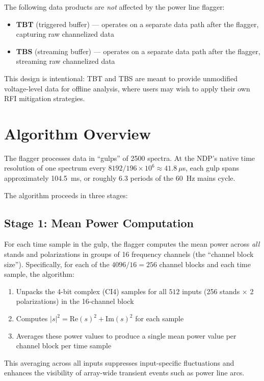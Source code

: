 The following data products are \emph{not} affected by the power line flagger:

\begin{itemize}
    \item \textbf{TBT} (triggered buffer) --- operates on a separate data path after the flagger, capturing raw channelized data
    \item \textbf{TBS} (streaming buffer) --- operates on a separate data path after the flagger, streaming raw channelized data
\end{itemize}

This design is intentional: TBT and TBS are meant to provide unmodified voltage-level data for offline analysis, where users may wish to apply their own RFI mitigation strategies.

\section{Algorithm Overview}

The flagger processes data in ``gulps'' of 2500 spectra. At the NDP's native time resolution of one spectrum every $8192 / 196 \times 10^6 \approx 41.8~\mu$s, each gulp spans approximately 104.5~ms, or roughly 6.3 periods of the 60~Hz mains cycle.

The algorithm proceeds in three stages:

\subsection{Stage 1: Mean Power Computation}

For each time sample in the gulp, the flagger computes the mean power across \emph{all} stands and polarizations in groups of 16 frequency channels (the ``channel block size''). Specifically, for each of the $4096/16 = 256$ channel blocks and each time sample, the algorithm:

\begin{enumerate}
    \item Unpacks the 4-bit complex (CI4) samples for all $512$ inputs (256 stands $\times$ 2 polarizations) in the 16-channel block
    \item Computes $|s|^2 = \mathrm{Re}(s)^2 + \mathrm{Im}(s)^2$ for each sample
    \item Averages these power values to produce a single mean power value per channel block per time sample
\end{enumerate}

This averaging across all inputs suppresses input-specific fluctuations and enhances the visibility of array-wide transient events such as power line arcs.

